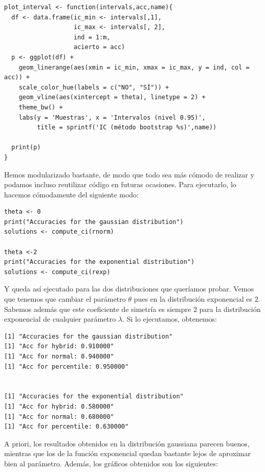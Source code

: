 \documentclass[a4paper]{article}
\begin{document}
   \begin{verbatim}
plot_interval <- function(intervals,acc,name){
  df <- data.frame(ic_min <- intervals[,1],
                   ic_max <- intervals[, 2],
                   ind = 1:m,
                   acierto = acc)
  p <- ggplot(df) +
    geom_linerange(aes(xmin = ic_min, xmax = ic_max, y = ind, col = acc)) +
    scale_color_hue(labels = c("NO", "SÍ")) +
    geom_vline(aes(xintercept = theta), linetype = 2) +
    theme_bw() +
    labs(y = 'Muestras', x = 'Intervalos (nivel 0.95)',
         title = sprintf('IC (método bootstrap %s)',name))

  print(p)
}
   \end{verbatim}

   Hemos modularizado bastante, de modo que todo sea más cómodo de realizar y podamos incluso reutilizar código en futuras ocasiones. Para ejecutarlo, lo hacemos cómodamente del siguiente modo:
   \begin{verbatim}
theta <- 0
print("Accuracies for the gaussian distribution")
solutions <- compute_ci(rnorm)

theta <-2
print("Accuracies for the exponential distribution")
solutions <- compute_ci(rexp)
   \end{verbatim}

   Y queda así ejecutado para las dos distribuciones que queríamos probar. Vemos que tenemos que cambiar el parámetro \(\theta\) pues en la distribución exponencial es \(2\). Sabemos además que este coeficiente de simetría es siempre \(2\) para la distribución exponencial de cualquier parámetro \(\lambda\). Si lo ejecutamos, obtenemos:
   \begin{verbatim}
[1] "Accuracies for the gaussian distribution"
[1] "Acc for hybrid: 0.910000"
[1] "Acc for normal: 0.940000"
[1] "Acc for percentile: 0.950000"


[1] "Accuracies for the exponential distribution"
[1] "Acc for hybrid: 0.580000"
[1] "Acc for normal: 0.680000"
[1] "Acc for percentile: 0.630000"
   \end{verbatim}

   A priori, los resultados obtenidos en la distribución gaussiana parecen buenos, mientras que los de la función exponencial quedan bastante lejos de aproximar bien al parámetro. Además, los gráficos obtenidos son los siguientes:
\end{document}
